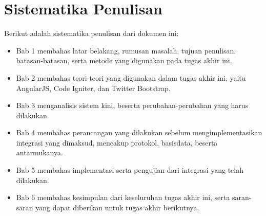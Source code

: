 \section{Sistematika Penulisan}
\label{sec: sistematikaPenulisan}

Berikut adalah sistematika penulisan dari dokumen ini:

\begin{itemize}
	\item Bab 1 membahas latar belakang, rumusan masalah, tujuan penulisan, batasan-batasan, serta metode yang digunakan pada tugas akhir ini.
	\item Bab 2 membahas teori-teori yang digunakan dalam tugas akhir ini, yaitu AngularJS, Code Igniter, dan Twitter Bootstrap.
	\item Bab 3 menganalisis sistem kini, beserta perubahan-perubahan yang harus dilakukan.
	\item Bab 4 membahas perancangan yang dilakukan sebelum mengimplementasikan integrasi yang dimaksud, mencakup protokol, basisdata, beserta antarmukanya.
	\item Bab 5 membahas implementasi serta pengujian dari integrasi yang telah dilakukan.
	\item Bab 6 membahas kesimpulan dari keseluruhan tugas akhir ini, serta saran-saran yang dapat diberikan untuk tugas akhir berikutnya.
\end{itemize}